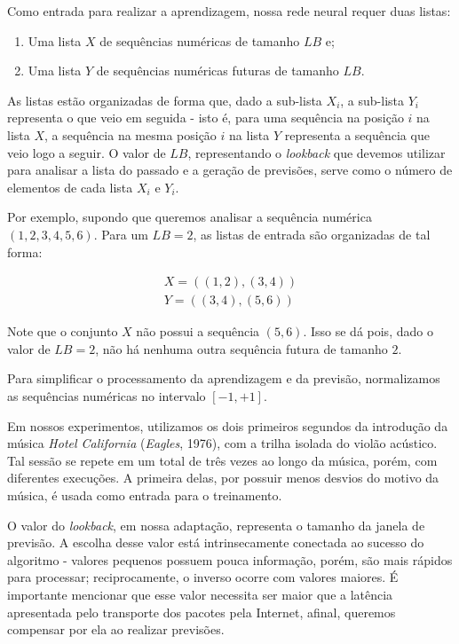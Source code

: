 Como entrada para realizar a aprendizagem, nossa rede neural requer duas listas:

\begin{enumerate}
    \item Uma lista $X$ de sequências numéricas de tamanho $LB$ e;
    \item Uma lista $Y$ de sequências numéricas futuras de tamanho $LB$.
\end{enumerate}

As listas estão organizadas de forma que, dado a sub-lista $X_i$, a sub-lista $Y_i$ representa o que veio em seguida - isto é, para uma sequência na posição $i$ na lista $X$, a sequência na mesma posição $i$ na lista $Y$ representa a sequência que veio logo a seguir. O valor de $LB$, representando o \textit{lookback} que devemos utilizar para analisar a lista do passado e a geração de previsões, serve como o número de elementos de cada lista $X_i$ e $Y_i$.

Por exemplo, supondo que queremos analisar a sequência numérica $(1, 2, 3, 4, 5, 6)$. Para um $LB = 2$, as listas de entrada são organizadas de tal forma:

\begin{equation}
\begin{split}
    X = ((1, 2), (3, 4)) \\
    Y = ((3, 4), (5, 6))
\end{split}
\end{equation}

Note que o conjunto $X$ não possui a sequência $(5,6)$. Isso se dá pois, dado o valor de $LB = 2$, não há nenhuma outra sequência futura de tamanho $2$.

Para simplificar o processamento da aprendizagem e da previsão, normalizamos as sequências numéricas no intervalo $[-1, +1]$.

Em nossos experimentos, utilizamos os dois primeiros segundos da introdução da música \textit{Hotel California} (\textit{Eagles}, 1976), com a trilha isolada do violão acústico. Tal sessão se repete em um total de três vezes ao longo da música, porém, com diferentes execuções. A primeira delas, por possuir menos desvios do motivo da música, é usada como entrada para o treinamento.

O valor do \textit{lookback}, em nossa adaptação, representa o tamanho da janela de previsão. A escolha desse valor está intrinsecamente conectada ao sucesso do algoritmo - valores pequenos possuem pouca informação, porém, são mais rápidos para processar; reciprocamente, o inverso ocorre com valores maiores. É importante mencionar que esse valor necessita ser maior que a latência apresentada pelo transporte dos pacotes pela Internet, afinal, queremos compensar por ela ao realizar previsões.

